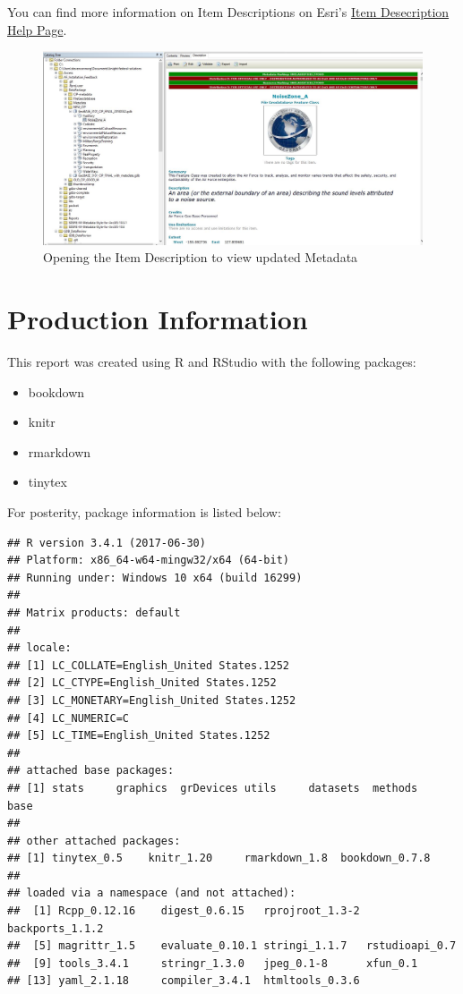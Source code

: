 \documentclass[openany]{book}
\providecommand{\tightlist}{%
  \setlength{\itemsep}{0pt}\setlength{\parskip}{0pt}}
\theoremstyle{definition}
\theoremstyle{definition}
\theoremstyle{definition}
\theoremstyle{remark}
\begin{document}
You can find more information on Item Descriptions on Esri's
\href{http://desktop.arcgis.com/en/arcmap/latest/map/working-with-arcmap/documenting-items-in-the-catalog-window.htm}{Item
Desecription Help Page}.

\begin{figure}[H]

{\centering \includegraphics[width=0.8\linewidth,]{figures/imMetaArc-after} 

}

\caption{Opening the Item Description to view updated Metadata}\label{fig:imMetaArcafter}
\end{figure}

\chapter{Production Information}\label{prodInfo}

This report was created using R \citep{R-base} and RStudio
\citep{Rstudio} with the following packages:

\begin{itemize}
\tightlist
\item
  bookdown \citep{R-bookdown}
\item
  knitr \citep{R-knitr}
\item
  rmarkdown \citep{R-rmarkdown}
\item
  tinytex \citep{R-tinytex}
\end{itemize}

For posterity, package information is listed below:

\begin{verbatim}
## R version 3.4.1 (2017-06-30)
## Platform: x86_64-w64-mingw32/x64 (64-bit)
## Running under: Windows 10 x64 (build 16299)
## 
## Matrix products: default
## 
## locale:
## [1] LC_COLLATE=English_United States.1252 
## [2] LC_CTYPE=English_United States.1252   
## [3] LC_MONETARY=English_United States.1252
## [4] LC_NUMERIC=C                          
## [5] LC_TIME=English_United States.1252    
## 
## attached base packages:
## [1] stats     graphics  grDevices utils     datasets  methods   base     
## 
## other attached packages:
## [1] tinytex_0.5    knitr_1.20     rmarkdown_1.8  bookdown_0.7.8
## 
## loaded via a namespace (and not attached):
##  [1] Rcpp_0.12.16    digest_0.6.15   rprojroot_1.3-2 backports_1.1.2
##  [5] magrittr_1.5    evaluate_0.10.1 stringi_1.1.7   rstudioapi_0.7 
##  [9] tools_3.4.1     stringr_1.3.0   jpeg_0.1-8      xfun_0.1       
## [13] yaml_2.1.18     compiler_3.4.1  htmltools_0.3.6
\end{verbatim}


\end{document}
